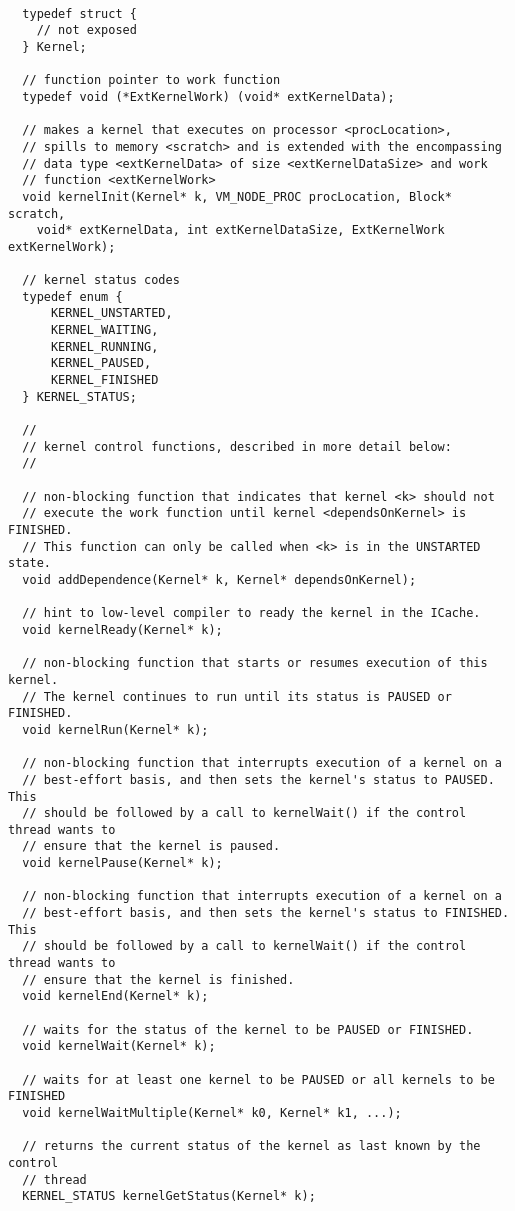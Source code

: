 {\small
\begin{verbatim}

  typedef struct {
    // not exposed
  } Kernel;

  // function pointer to work function
  typedef void (*ExtKernelWork) (void* extKernelData);

  // makes a kernel that executes on processor <procLocation>,
  // spills to memory <scratch> and is extended with the encompassing
  // data type <extKernelData> of size <extKernelDataSize> and work
  // function <extKernelWork>
  void kernelInit(Kernel* k, VM_NODE_PROC procLocation, Block* scratch,
    void* extKernelData, int extKernelDataSize, ExtKernelWork extKernelWork);

  // kernel status codes
  typedef enum {
      KERNEL_UNSTARTED,
      KERNEL_WAITING,
      KERNEL_RUNNING,
      KERNEL_PAUSED,
      KERNEL_FINISHED
  } KERNEL_STATUS;

  //
  // kernel control functions, described in more detail below:
  //

  // non-blocking function that indicates that kernel <k> should not 
  // execute the work function until kernel <dependsOnKernel> is FINISHED.  
  // This function can only be called when <k> is in the UNSTARTED state.
  void addDependence(Kernel* k, Kernel* dependsOnKernel);

  // hint to low-level compiler to ready the kernel in the ICache.
  void kernelReady(Kernel* k);

  // non-blocking function that starts or resumes execution of this kernel. 
  // The kernel continues to run until its status is PAUSED or FINISHED.
  void kernelRun(Kernel* k);

  // non-blocking function that interrupts execution of a kernel on a
  // best-effort basis, and then sets the kernel's status to PAUSED.  This 
  // should be followed by a call to kernelWait() if the control thread wants to
  // ensure that the kernel is paused.
  void kernelPause(Kernel* k);

  // non-blocking function that interrupts execution of a kernel on a 
  // best-effort basis, and then sets the kernel's status to FINISHED.  This 
  // should be followed by a call to kernelWait() if the control thread wants to
  // ensure that the kernel is finished.
  void kernelEnd(Kernel* k);

  // waits for the status of the kernel to be PAUSED or FINISHED.
  void kernelWait(Kernel* k);

  // waits for at least one kernel to be PAUSED or all kernels to be FINISHED
  void kernelWaitMultiple(Kernel* k0, Kernel* k1, ...);

  // returns the current status of the kernel as last known by the control
  // thread
  KERNEL_STATUS kernelGetStatus(Kernel* k);
\end{verbatim}}

